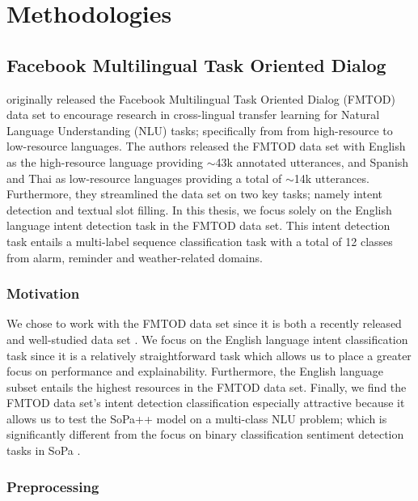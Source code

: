 \chapter{Methodologies}

\label{chapter:methodologies}

\section{Facebook Multilingual Task Oriented Dialog}

\citet{schuster-etal-2019-cross-lingual} originally released the Facebook Multilingual Task Oriented Dialog (FMTOD) data set to encourage research in cross-lingual transfer learning for Natural Language Understanding (NLU) tasks; specifically from from high-resource to low-resource languages. The authors released the FMTOD data set with English as the high-resource language providing $\sim$43k annotated utterances, and Spanish and Thai as low-resource languages providing a total of $\sim$14k utterances. Furthermore, they streamlined the data set on two key tasks; namely intent detection and textual slot filling. In this thesis, we focus solely on the English language intent detection task in the FMTOD data set. This intent detection task entails a multi-label sequence classification task with a total of 12 classes from alarm, reminder and weather-related domains.

\subsection{Motivation}

We chose to work with the FMTOD data set since it is both a recently released and well-studied data set \citep{schuster-etal-2019-cross-lingual,zhang2019joint,zhang-etal-2020-intent}. We focus on the English language intent classification task since it is a relatively straightforward task which allows us to place a greater focus on performance and explainability. Furthermore, the English language subset entails the highest resources in the FMTOD data set. Finally, we find the FMTOD data set's intent detection classification especially attractive because it allows us to test the SoPa++ model on a multi-class NLU problem; which is significantly different from the focus on binary classification sentiment detection tasks in SoPa \citep{schwartz2018sopa}.

\subsection{Preprocessing}

